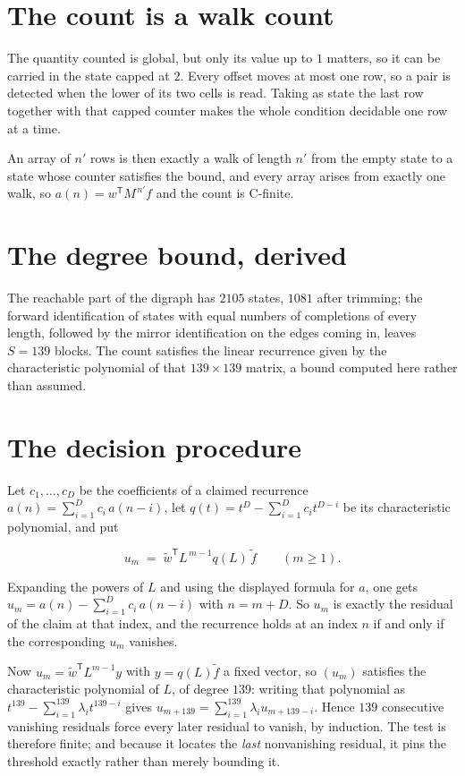 \documentclass[11pt]{article}
\theoremstyle{definition}
\begin{document}
\section{The count is a walk count}

The quantity counted is global, but only its value up to $1$ matters, so it can be carried in the state capped at $2$. Every offset moves at most one row, so a pair is detected when the lower of its two cells is read. Taking as state the last row together with that capped counter makes the whole condition decidable one row at a time.

An array of $n'$ rows is then exactly a walk of length $n'$ from the empty state to a state whose counter satisfies the bound, and every array arises from exactly one walk, so $a(n) = w^{\mathsf T}M^{\,n'}f$ and the count is C-finite.

\section{The degree bound, derived}

The reachable part of the digraph has $2105$ states, $1081$ after trimming; the forward identification of states with equal numbers of completions of every length, followed by the mirror identification on the edges coming in, leaves $S = 139$ blocks. The count satisfies the linear recurrence given by the characteristic polynomial of that $139\times139$ matrix, a bound computed here rather than assumed.

\section{The decision procedure}

Let $c_1,\dots,c_D$ be the coefficients of a claimed recurrence $a(n) = \sum_{i=1}^{D} c_i\,a(n-i)$, let $q(t) = t^{D} - \sum_{i=1}^{D} c_i t^{D-i}$ be its characteristic polynomial, and put

\[u_m \;=\; \tilde w^{\mathsf T} L^{\,m-1} q(L)\,\tilde f \qquad (m \ge 1).\]

Expanding the powers of $L$ and using the displayed formula for $a$, one gets $u_m = a(n) - \sum_{i=1}^{D} c_i\,a(n-i)$ with $n = m + D$. So $u_m$ is exactly the residual of the claim at that index, and the recurrence holds at an index $n$ if and only if the corresponding $u_m$ vanishes.

Now $u_m = \tilde w^{\mathsf T} L^{m-1} y$ with $y = q(L)\tilde f$ a fixed vector, so $(u_m)$ satisfies the characteristic polynomial of $L$, of degree $139$: writing that polynomial as $t^{139} - \sum_{i=1}^{139} \lambda_i t^{139-i}$ gives $u_{m+139} = \sum_{i=1}^{139} \lambda_i u_{m+139-i}$. Hence $139$ consecutive vanishing residuals force every later residual to vanish, by induction. The test is therefore finite; and because it locates the {\itshape last} nonvanishing residual, it pins the threshold exactly rather than merely bounding it.
\end{document}
